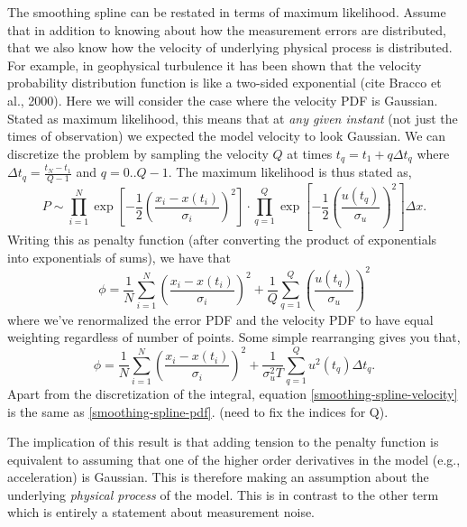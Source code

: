 \documentclass[twocol]{ametsoc}
\begin{document}
The smoothing spline can be restated in terms of maximum likelihood. Assume that in addition to knowing about how the measurement errors are distributed, that we also know how the velocity of underlying physical process is distributed. For example, in geophysical turbulence it has been shown that the velocity probability distribution function is like a two-sided exponential (cite Bracco et al., 2000). Here we will consider the case where the velocity PDF is Gaussian. Stated as maximum likelihood, this means that at \emph{any given instant} (not just the times of observation) we expected the model velocity to look Gaussian. We can discretize the problem by sampling the velocity $Q$ at times $t_q = t_1 + q \Delta t_q$ where $\Delta t_q=\frac{t_N-t_1}{Q-1}$ and $q=0..Q-1$. The maximum likelihood is thus stated as,
\begin{equation}
\label{gaussian-max-likelihood}
P \sim \prod^N _{i=1}\exp \left[ -\frac{1}{2} \left( \frac{x_i - x(t_i)}{\sigma_i} \right)^2 \right] \cdot \prod^{Q}_{q=1} \exp \left[  - \frac{1}{2} \left(  \frac{u(t_q)}{\sigma_u} \right)^2 \right] \Delta x.
\end{equation}
Writing this as penalty function (after converting the product of exponentials into exponentials of sums), we have that
\begin{equation}
\phi =  \frac{1}{N} \sum^N _{i=1}\left( \frac{x_i - x(t_i)}{\sigma_i} \right)^2 + \frac{1}{Q} \sum^{Q}_{q=1}  \left(  \frac{u(t_q)}{\sigma_u} \right)^2
\end{equation}
where we've renormalized the error PDF and the velocity PDF to have equal weighting regardless of number of points. Some simple rearranging gives you that,
\begin{equation}
\label{smoothing-spline-pdf}
\phi = \frac{1}{N} \sum^N _{i=1}  \left( \frac{x_i - x(t_i)}{\sigma_i} \right)^2 + \frac{1}{\sigma_u^2 T} \sum^{Q}_{q=1}  u^2(t_q) \Delta t_q.
\end{equation}
Apart from the discretization of the integral, equation \ref{smoothing-spline-velocity} is the same as \ref{smoothing-spline-pdf}. (need to fix the indices for Q).

The implication of this result is that adding tension to the penalty function is equivalent to assuming that one of the higher order derivatives in the model (e.g., acceleration) is Gaussian. This is therefore making an assumption about the underlying \emph{physical process} of the model. This is in contrast to the other term which is entirely a statement about measurement noise.
\end{document}
